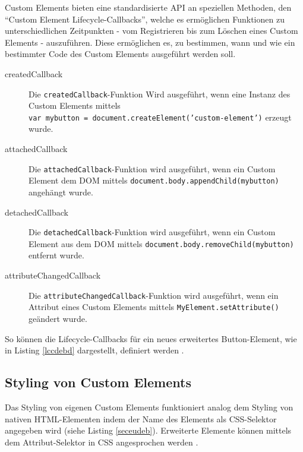 Custom Elements bieten eine standardisierte \ac{API} an speziellen Methoden, den ``Custom Element Lifecycle-Callbacks'', welche es ermöglichen Funktionen zu unterschiedlichen Zeitpunkten - vom Registrieren bis zum Löschen eines Custom Elements - auszuführen. Diese ermöglichen es, zu bestimmen, wann und wie ein bestimmter Code des Custom Elements ausgeführt werden soll.

\begin{description}
  \item[createdCallback] Die \texttt{createdCallback}-Funktion Wird ausgeführt, wenn eine Instanz des Custom Elements mittels \texttt{var\ mybutton\ =\ document.createElement('custom-element')} erzeugt wurde.
  \item[attachedCallback] Die \texttt{attachedCallback}-Funktion wird ausgeführt, wenn ein Custom Element dem \ac{DOM} mittels \texttt{document.body.appendChild(mybutton)} angehängt wurde.
  \item[detachedCallback] Die \texttt{detachedCallback}-Funktion wird ausgeführt, wenn ein Custom Element aus dem \ac{DOM} mittels \texttt{document.body.removeChild(mybutton)} entfernt wurde.
  \item[attributeChangedCallback] Die \texttt{attributeChangedCallback}-Funktion wird ausgeführt, wenn ein Attribut eines Custom Elements mittels \texttt{MyElement.setAttribute()} geändert wurde.
\end{description}

So können die Lifecycle-Callbacks für ein neues erweitertes Button-Element, wie in Listing \ref{lccdebd} dargestellt, definiert werden \cite{citeulike:13844988}.




\subsection{Styling von Custom Elements}\label{styling-von-custom-elements}

Das Styling von eigenen Custom Elements funktioniert analog dem Styling von nativen \ac{HTML}-Elementen indem der Name des Elements als \ac{CSS}-Selektor angegeben wird (siehe Listing \ref{seceudeb}). Erweiterte Elemente können mittels dem Attribut-Selektor in \ac{CSS} angesprochen werden \cite[S. 127-138]{citeulike:13844975}.




